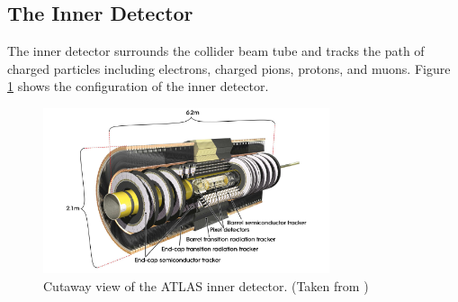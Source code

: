 \subsection{The Inner Detector}
\label{LHC:ID}
\indent The inner detector surrounds the collider beam tube and tracks the path of charged particles including electrons, charged pions, protons, and muons. Figure \ref{LHC:fig:ATLASID} shows the configuration of the inner detector. ~\\
\begin{figure}[h!]
\centering
\includegraphics[width=0.75\textwidth, angle=0]{figures/DET/ATLAS_ID_Detector.PNG}
\caption{ Cutaway view of the ATLAS inner detector.  (Taken from \cite{biblio:JINST}) \label{LHC:fig:ATLASID}}
\end{figure}

